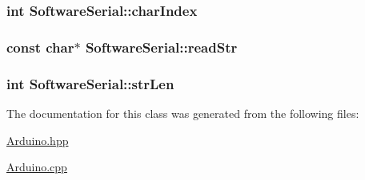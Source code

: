 \subsubsection[{\texorpdfstring{char\+Index}{charIndex}}]{\setlength{\rightskip}{0pt plus 5cm}int Software\+Serial\+::char\+Index}\hypertarget{classSoftwareSerial_a599ff1674d027e98407a6b1a7a1bacb7}{}\label{classSoftwareSerial_a599ff1674d027e98407a6b1a7a1bacb7}
\subsubsection[{\texorpdfstring{read\+Str}{readStr}}]{\setlength{\rightskip}{0pt plus 5cm}const char$\ast$ Software\+Serial\+::read\+Str}\hypertarget{classSoftwareSerial_a43e46ebff313829a8fc6398de7b60278}{}\label{classSoftwareSerial_a43e46ebff313829a8fc6398de7b60278}
\subsubsection[{\texorpdfstring{str\+Len}{strLen}}]{\setlength{\rightskip}{0pt plus 5cm}int Software\+Serial\+::str\+Len}\hypertarget{classSoftwareSerial_a5e5e2385bdb3f9c2fb20e31767679d5e}{}\label{classSoftwareSerial_a5e5e2385bdb3f9c2fb20e31767679d5e}


The documentation for this class was generated from the following files\+:\begin{DoxyCompactItemize}
\item 
\hyperlink{Arduino_8hpp}{Arduino.\+hpp}\item 
\hyperlink{Arduino_8cpp}{Arduino.\+cpp}\end{DoxyCompactItemize}

